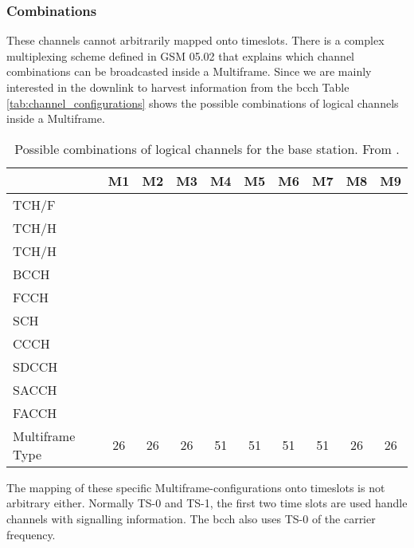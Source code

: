 \subsubsection{Combinations}
These channels cannot arbitrarily mapped onto timeslots.
There is a complex multiplexing scheme defined in GSM 05.02 \cite{gsm0502} that explains which channel combinations can be broadcasted inside a Multiframe.
Since we are mainly interested in the downlink to harvest information from the \gls{bcch} Table \ref{tab:channel_configurations} shows the possible combinations of logical channels inside a Multiframe.
\begin{table}
	\centering
	\begin{tabular}{lccccccccc}
	\toprule
						&M1&M2&M3&M4&M5&M6&M7&M8&M9\\
	\midrule
	TCH/F				&\cellcolor[gray]{0.7}&&&&&&&\cellcolor[gray]{0.7}&\cellcolor[gray]{0.7}\\
	TCH/H				&&\cellcolor[gray]{0.7}&\cellcolor[gray]{0.7}&&&&&&\\
	TCH/H				&&&\cellcolor[gray]{0.7}&&&&&&\\
	BCCH				&&&&\cellcolor[gray]{0.7}&\cellcolor[gray]{0.7}&\cellcolor[gray]{0.7}&&&\\
	FCCH				&&&&\cellcolor[gray]{0.7}&\cellcolor[gray]{0.7}&&&&\\
	SCH					&&&&\cellcolor[gray]{0.7}&\cellcolor[gray]{0.7}&&&&\\
	CCCH				&&&&\cellcolor[gray]{0.7}&\cellcolor[gray]{0.7}&\cellcolor[gray]{0.7}&&&\\
	SDCCH				&&&&&\cellcolor[gray]{0.7}&&\cellcolor[gray]{0.7}&&\\
	SACCH				&\cellcolor[gray]{0.7}&\cellcolor[gray]{0.7}&\cellcolor[gray]{0.7}&&\cellcolor[gray]{0.7}&&\cellcolor[gray]{0.7}&\cellcolor[gray]{0.7}&\cellcolor[gray]{0.7}\\
	FACCH				&\cellcolor[gray]{0.7}&\cellcolor[gray]{0.7}&\cellcolor[gray]{0.7}&&&&&\cellcolor[gray]{0.7}&\\
	\midrule
	Multiframe Type		&26&26&26&51&51&51&51&26&26\\
	\bottomrule
	\end{tabular}
	\caption{Possible combinations of logical channels for the base station. From \cite{GSM2009}.}
\end{table}
The mapping of these specific Multiframe-configurations onto timeslots is not arbitrary either.
Normally TS-0 and TS-1, the first two time slots are used handle channels with signalling information.
The \gls{bcch} also uses TS-0 of the carrier frequency.

